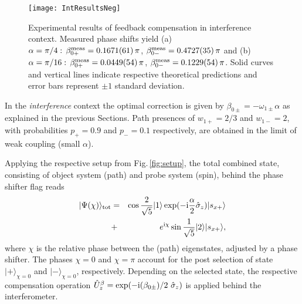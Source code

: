 \documentclass[english,keywords,aps,twocolumn]{revtex4-1}
\begin{document}
\begin{figure}[!b]
\texttt{[image: IntResultsNeg]}
	\caption{Experimental results of feedback compensation in interference context. Measured phase shifts yield (a) $\alpha=\pi/4:\,\beta^{\rm{meas}}_{0+}=0.1671(61)\,\pi$, $\beta^{\rm{meas}}_{0-}=0.4727(35)\,\pi$ and (b)  $\alpha=\pi/16:\,\beta^{\rm{meas}}_{0+}=0.0449(54)\,\pi$, $\beta^{\rm{meas}}_{0-}=0.1229(54)\,\pi$. Solid curves and vertical lines indicate respective theoretical predictions and error bars represent $\pm 1$ standard deviation.  }\label{fig:IntResults}
	\end{figure}
%

In the \emph{interference} context the optimal correction is given by $\beta_{0\pm}=-\omega_{1\pm}\alpha$ as explained in the previous Sections. Path presences of $w_{1+}=2/3$ and $w_{1-}=2$, with probabilities $p_+=0.9$ and $p_-=0.1$ respectively, are obtained in the limit of weak coupling (small $\alpha$).

%
%

Applying the respective setup from Fig.\,\ref{fig:setup}, the total combined state, consisting of object system (path) and probe system (spin), behind the phase shifter flag reads 
%
\begin{eqnarray}
\vert\Psi(\chi)\rangle_{\rm{tot}} &=&\cos\frac{2}{\sqrt 5}\vert 1\rangle\,{\textrm{exp}}(-{\rm i}\frac{\alpha}{2}\hat\sigma_z)\vert s_{x+}\rangle\nonumber\\&+&e^{\rm{i}\chi}\sin\frac{1}{\sqrt 5}\vert 2 \rangle \vert s_{x+}\rangle,
\end{eqnarray}
%
where $\chi$ is the relative phase between the (path) eigenstates, adjusted by a phase shifter. The phases $\chi=0$ and $\chi=\pi$ account for the post selection of state $|+\rangle_{\chi=0}$ and $|-\rangle_{\chi=0}$, respectively. Depending on the selected state, the respective compensation operation $\hat U^\beta_z=\textrm{exp}(-{\rm i}(\beta_{0\pm})/2\,\,\hat\sigma_z)$ is applied behind the interferometer.
\end{document}

